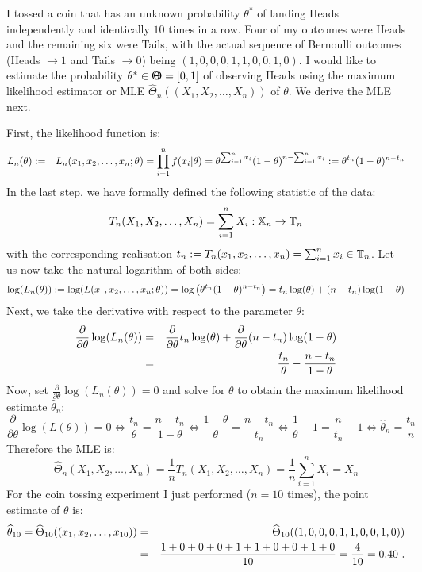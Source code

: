 {\begin{example}\label{EX:CoinTossingML}
I tossed a coin that has an unknown probability $\theta^*$ of landing Heads independently and identically $10$ times in a row.  Four of my outcomes were Heads and the remaining six were Tails, with the actual sequence of Bernoulli outcomes (Heads $\to 1$ and Tails $\to 0$) being $(1,0,0,0,1,1,0,0,1,0)$.  I would like to estimate the probability $\theta^* \in {\Theta}\mspace{-11 mu}{\Theta} = [0,1]$ of observing Heads using the maximum likelihood estimator or MLE $\widehat{\Theta}_n((X_1,X_2,\ldots,X_n))$ of $\theta$. We derive the MLE next.

First, the likelihood function is:
\begin{eqnarray}
L_n(\theta) &:=& L_n(x_1,x_2,\ldots,x_n; \theta)  =  \prod_{i=1}^n f(x_i|\theta) = \theta^{\sum_{i=1}^n x_i} (1-\theta)^ {n-\sum_{i=1}^n x_i} := \theta^{t_n} (1-\theta)^{n-t_n} \notag 
\end{eqnarray}
In the last step, we have formally defined the following statistic of the data: 
$$T_n(X_1,X_2,\ldots,X_n)=\sum_{i=1}^n X_i :  \mathbb{X}_n \rightarrow \mathbb{T}_n$$ with the corresponding realisation $t_n := T_n(x_1,x_2,\ldots,x_n)=\sum_{i=1}^n x_i \in \mathbb{T}_n$.  Let us now take the natural logarithm of both sides:
\begin{eqnarray}
\log(L_n(\theta)) := \log(L(x_1,x_2,\ldots,x_n; \theta))   
= \log \left( \theta^{t_n} (1-\theta)^ {n-t_n} \right) 
= t_n \log(\theta) + (n-t_n) \log(1-\theta) \notag
\end{eqnarray}
Next, we take the derivative with respect to the parameter $\theta$:
\begin{eqnarray}
\frac{\partial}{\partial \theta} \log(L_n(\theta)) 
&=& \frac{\partial}{\partial \theta}  t_n \log(\theta) + \frac{\partial}{\partial \theta}  (n-t_n) \log(1-\theta) \notag \\
&=& \frac{t_n}{\theta} - \frac{n-t_n}{1-\theta} \notag
\end{eqnarray}
Now, set $\frac{\partial}{\partial \theta} \log(L_n(\theta))=0$ and solve for $\theta$ to obtain the maximum likelihood estimate  $\widehat{\theta}_n$:
\[
\frac{\partial}{\partial \theta} \log(L(\theta)) = 0 \iff  
\frac{t_n}{\theta} = \frac{n-t_n}{1-\theta} \iff
\frac{1-\theta}{\theta} = \frac{n-t_n}{t_n} \iff
\frac{1}{\theta}-1 = \frac{n}{t_n}-1 \iff \widehat{\theta}_n = \frac{t_n}{n}
\]
Therefore the MLE is:
\[
\widehat{\Theta}_n(X_1,X_2,\ldots,X_n) = \frac{1}{n}T_n(X_1,X_2,\ldots,X_n) = \frac{1}{n} \sum_{i=1}^n X_i = \overline{X}_n
\]
For the coin tossing experiment I just performed ($n=10$ times), the point estimate of $\theta$ is:
\begin{eqnarray}
\widehat{\theta}_{10} = \widehat{\Theta}_{10}((x_1,x_2,\ldots,x_{10})) 
&=&\widehat{\Theta}_{10}((1,0,0,0,1,1,0,0,1,0)) \notag \\
&=& \frac{1+0+0+0+1+1+0+0+1+0}{10}=\frac{4}{10}=0.40 \notag \ .
\end{eqnarray}
\end{example}

}
